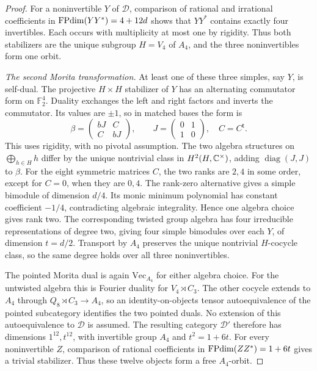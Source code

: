 \begin{proof}
For a noninvertible $Y$ of $\mathcal D$, comparison of rational and
irrational coefficients in $\operatorname{FPdim}(YY^*)=4+12d$ shows that $YY^*$
contains exactly four invertibles. Each occurs with multiplicity at
most one by rigidity. Thus both stabilizers are the unique subgroup
$H=V_4$ of $A_4$, and the three noninvertibles form one orbit.

\emph{The second Morita transformation.}
At least one of these three simples, say $Y$, is self-dual. The
projective $H\times H$ stabilizer of $Y$ has an alternating
commutator form on $\mathbb F_2^4$. Duality exchanges the left and
right factors and inverts the commutator. Its values are $\pm1$,
so in matched bases the form is
\[
 \beta=\begin{pmatrix}bJ&C\\ C&bJ\end{pmatrix},\qquad
 J=\begin{pmatrix}0&1\\1&0\end{pmatrix},\quad C=C^{\mathsf t}.
\]
This uses rigidity, with no pivotal assumption. The two algebra
structures on $\bigoplus_{h\in H}h$ differ by the unique nontrivial
class in $H^2(H,\mathbb C^\times)$, adding $\operatorname{diag}(J,J)$ to
$\beta$. For the eight symmetric matrices $C$, the two ranks are
$2,4$ in some order, except for $C=0$, when they are $0,4$.
The rank-zero alternative gives a simple bimodule of dimension
$d/4$. Its monic minimum polynomial has constant coefficient
$-1/4$, contradicting algebraic integrality. Hence one algebra
choice gives rank two. The corresponding twisted group algebra
has four irreducible representations of degree two, giving four
simple bimodules over each $Y$, of dimension $t=d/2$.
Transport by $A_4$ preserves the unique nontrivial $H$-cocycle
class, so the same degree holds over all three noninvertibles.

The pointed Morita dual is again $\mathrm{Vec}_{A_4}$ for either
algebra choice. For the untwisted algebra this is Fourier duality
for $V_4\rtimes C_3$. The other cocycle extends to $A_4$ through
$Q_8\rtimes C_3\to A_4$, so an identity-on-objects tensor
autoequivalence of the pointed subcategory identifies the two
pointed duals. No extension of this autoequivalence to $\mathcal D$
is assumed. The resulting category $\mathcal D'$ therefore has
dimensions $1^{12},t^{12}$, with invertible group $A_4$ and
$t^2=1+6t$. For every noninvertible $Z$, comparison of rational
coefficients in $\operatorname{FPdim}(ZZ^*)=1+6t$ gives a trivial stabilizer.
Thus these twelve objects form a free $A_4$-orbit.


\end{proof}

